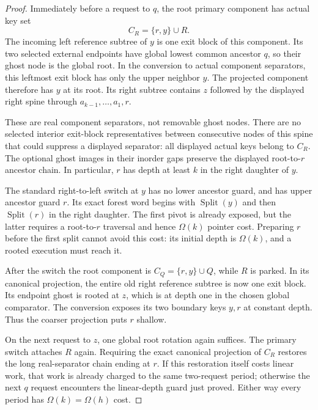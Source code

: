 \documentclass[11pt]{article}
\begin{document}
\begin{proof}
Immediately before a request to $q$, the root primary component has
actual key set
\[
 C_R=\{r,y\}\cup R.
\]
The incoming left reference subtree of $y$ is one exit block of this
component. Its two selected external endpoints have global lowest
common ancestor $q$, so their ghost node is the global root. In the
conversion to actual component separators, this leftmost exit block
has only the upper neighbor $y$. The projected component therefore
has $y$ at its root. Its right subtree contains $z$ followed by the
displayed right spine through $a_{k-1},\ldots,a_1,r$.

These are real component separators, not removable ghost nodes. There
are no selected interior exit-block representatives between consecutive
nodes of this spine that could suppress a displayed separator: all
displayed actual keys belong to $C_R$. The optional ghost images in
their inorder gaps preserve the displayed root-to-$r$ ancestor chain.
In particular, $r$ has depth at least $k$ in the right daughter of $y$.

The standard right-to-left switch at $y$ has no lower ancestor guard,
and has upper ancestor guard $r$. Its exact forest word begins with
$\operatorname{Split}(y)$ and then $\operatorname{Split}(r)$ in the
right daughter. The first pivot is already exposed, but the latter
requires a root-to-$r$ traversal and hence $\Omega(k)$ pointer cost.
Preparing $r$ before the first split cannot avoid this cost: its
initial depth is $\Omega(k)$, and a rooted execution must reach it.

After the switch the root component is
$C_Q=\{r,y\}\cup Q$, while $R$ is parked. In its canonical projection,
the entire old right reference subtree is now one exit block. Its
endpoint ghost is rooted at $z$, which is at depth one in the chosen
global comparator. The conversion exposes its two boundary keys
$y,r$ at constant depth. Thus the coarser projection puts $r$ shallow.

On the next request to $z$, one global root rotation again suffices.
The primary switch attaches $R$ again. Requiring the exact canonical
projection of $C_R$ restores the long real-separator chain ending at
$r$. If this restoration itself costs linear work, that work is
already charged to the same two-request period; otherwise the next
$q$ request encounters the linear-depth guard just proved. Either
way every period has $\Omega(k)=\Omega(h)$ cost.
\end{proof}
\end{document}
